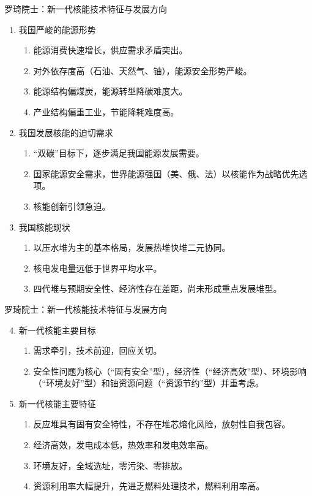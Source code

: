 \documentclass{ctexbeamer}
\begin{document}
\begin{frame}{罗琦院士：新一代核能技术特征与发展方向}
    \begin{enumerate}
        \item 我国严峻的能源形势
        \begin{enumerate}
            \item 能源消费快速增长，供应需求矛盾突出。
            \item 对外依存度高（石油、天然气、铀），能源安全形势严峻。
            \item 能源结构偏煤炭，能源转型降碳难度大。
            \item 产业结构偏重工业，节能降耗难度高。
        \end{enumerate}
        \item 我国发展核能的迫切需求
        \begin{enumerate}
            \item “双碳”目标下，逐步满足我国能源发展需要。
            \item 国家能源安全需求，世界能源强国（美、俄、法）以核能作为战略优先选项。
            \item 核能创新引领急迫。
        \end{enumerate}
        \item 我国核能现状
        \begin{enumerate}
            \item 以压水堆为主的基本格局，发展热堆快堆二元协同。
            \item 核电发电量远低于世界平均水平。
            \item 四代堆与预期安全性、经济性存在差距，尚未形成重点发展堆型。
        \end{enumerate}
    \end{enumerate}
\end{frame}

\begin{frame}{罗琦院士：新一代核能技术特征与发展方向}
    \begin{enumerate}\setcounter{enumi}{3}
        \item 新一代核能主要目标
        \begin{enumerate}
            \item 需求牵引，技术前迎，回应关切。
            \item 安全性问题为核心（“固有安全”型），经济性（“经济高效”型）、环境影响（“环境友好”型）和铀资源问题（“资源节约”型）并重考虑。
        \end{enumerate}
        \item 新一代核能主要特征
        \begin{enumerate}
            \item 反应堆具有固有安全特性，不存在堆芯熔化风险，放射性自我包容。
            \item 经济高效，发电成本低，热效率和发电效率高。
            \item 环境友好，全域选址，零污染、零排放。
            \item 资源利用率大幅提升，先进乏燃料处理技术，燃料利用率高。
        \end{enumerate}
    \end{enumerate}
\end{frame}
\end{document}
